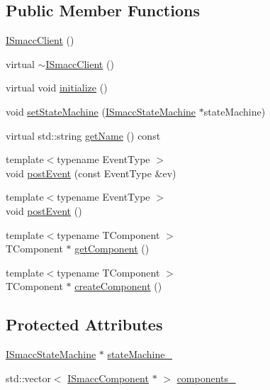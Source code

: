 \subsection*{Public Member Functions}
\begin{DoxyCompactItemize}
\item 
\hyperlink{classsmacc_1_1ISmaccClient_a40222ad8b9b7962755434025b1fd5ae7}{I\+Smacc\+Client} ()
\item 
virtual \hyperlink{classsmacc_1_1ISmaccClient_a030e17771bf2e404a6fad97273c4d7f4}{$\sim$\+I\+Smacc\+Client} ()
\item 
virtual void \hyperlink{classsmacc_1_1ISmaccClient_a974ebb6ad6cf812e7b9de6b78b3d901f}{initialize} ()
\item 
void \hyperlink{classsmacc_1_1ISmaccClient_a28fd6ca2bcf9c5e57f3cc16fb0a076d3}{set\+State\+Machine} (\hyperlink{classsmacc_1_1ISmaccStateMachine}{I\+Smacc\+State\+Machine} $\ast$state\+Machine)
\item 
virtual std\+::string \hyperlink{classsmacc_1_1ISmaccClient_a20846aabfd1de832aa27d7a8237a1742}{get\+Name} () const 
\item 
{\footnotesize template$<$typename Event\+Type $>$ }\\void \hyperlink{classsmacc_1_1ISmaccClient_a46cbc0d695214efe40d29247323bfc80}{post\+Event} (const Event\+Type \&ev)
\item 
{\footnotesize template$<$typename Event\+Type $>$ }\\void \hyperlink{classsmacc_1_1ISmaccClient_a21a79203cb44fc717d4d977c190327c6}{post\+Event} ()
\item 
{\footnotesize template$<$typename T\+Component $>$ }\\T\+Component $\ast$ \hyperlink{classsmacc_1_1ISmaccClient_adef78db601749ca63c19e74a27cb88cc}{get\+Component} ()
\item 
{\footnotesize template$<$typename T\+Component $>$ }\\T\+Component $\ast$ \hyperlink{classsmacc_1_1ISmaccClient_a8c58945bc0d007239076d964e9ab15cd}{create\+Component} ()
\end{DoxyCompactItemize}
\subsection*{Protected Attributes}
\begin{DoxyCompactItemize}
\item 
\hyperlink{classsmacc_1_1ISmaccStateMachine}{I\+Smacc\+State\+Machine} $\ast$ \hyperlink{classsmacc_1_1ISmaccClient_a926e4f2ae796def63d48dca389a48c47}{state\+Machine\+\_\+}
\item 
std\+::vector$<$ \hyperlink{classsmacc_1_1ISmaccComponent}{I\+Smacc\+Component} $\ast$ $>$ \hyperlink{classsmacc_1_1ISmaccClient_ab0b212380d3e16ffbd338034ce54073a}{components\+\_\+}
\end{DoxyCompactItemize}
